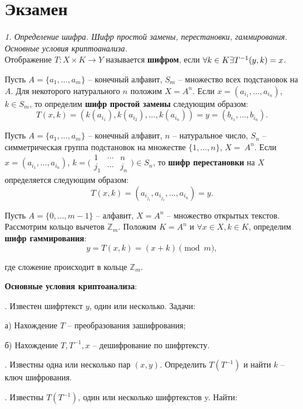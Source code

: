 \chapter{Экзамен}
\noindent \textit{1. Определение шифра. Шифр простой замены, перестановки, гаммирования. Основные условия криптоанализа.} \\

Отображение $T: X \times K \rightarrow Y$ называется \textbf{шифром}, если $\forall k \in K \\ \exists T^{-1} (y, k) = x$.

Пусть $A = \{ a_1, \ldots , a_m \}$ -- конечный алфавит, $S_m$ -- множество всех подстановок на $A$. Для некоторого натурального $n$ положим $X = A^n$. Если $x = (a_{i_1}, \ldots, a_{i_n})$, $k \in S_m$, то определим \textbf{шифр простой замены} следующим образом:
$$T(x, k) = (k(a_{i_1}), k(a_{i_2}), \ldots, k(a_{i_n})) = y = (b_{i_1}, \ldots, b_{i_n}).$$

Пусть $A = \{ a_1, \ldots , a_m \}$ -- конечный алфавит, $n$ -- натуральное число, $S_n$ -- симметрическая группа подстановок на множестве $\{1, \ldots, n\}$, $X =~A^n$. Если $x = (a_{i_1}, \ldots, a_{i_n})$, $k = \bigl(\begin{smallmatrix}
    1 & \cdots & n \\
    j_1 & \cdots & j_n
  \end{smallmatrix}\bigr) \in S_n$, то \textbf{шифр перестановки} на $X$ определяется следующим образом:
$$T(x, k) = (a_{i_{j_1}}, a_{i_{j_2}}, \ldots, a_{i_n}) = y.$$

Пусть $A = \{ 0, \ldots , m - 1 \}$ -- алфавит, $X =A^n$ -- множество открытых текстов. Рассмотрим кольцо вычетов $\mathbb{Z}_m$. Положим $K = A^n$ и $\forall x \in X, k \in K$, определим \textbf{шифр гаммирования}:
$$y = T(x, k) = (x + k) \pmod m,$$

\noindent где сложение происходит в кольце $\mathbb{Z}_m$.

\newpage
\textbf{Основные условия криптоанализа}:

. Известен шифртекст $y$, один или несколько. Задачи:

а) Нахождение $T$ -- преобразования зашифрования;

б) Нахождение $T, T^{-1}, x$ -- дешифрование по шифртексту.

. Известны одна или несколько пар $(x, y)$. Определить $T(T^{-1})$ и найти $k$ -- ключ шифрования.

. Известны $T(T^{-1})$, один или несколько шифртекстов y. Найти:

